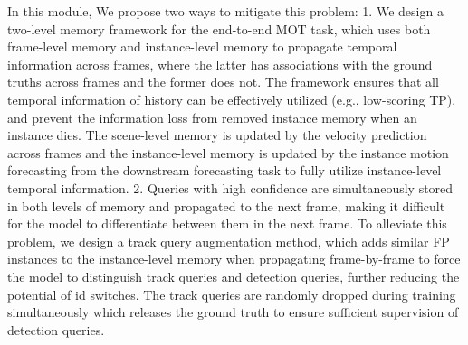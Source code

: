 

In this module, We propose two ways to mitigate this problem: 1. We design a two-level memory framework for the end-to-end MOT task, which uses both frame-level memory and instance-level memory to propagate temporal information across frames, where the latter has associations with the ground truths across frames and the former does not. The framework ensures that all temporal information of history can be effectively utilized (e.g., low-scoring TP), and prevent the information loss from removed instance memory when an instance dies. The scene-level memory is updated by the velocity prediction across frames and the instance-level memory is updated by the instance motion forecasting from the downstream forecasting task to fully utilize instance-level temporal information. 2. Queries with high confidence are simultaneously stored in both levels of memory and propagated to the next frame, making it difficult for the model to differentiate between them in the next frame. To alleviate this problem, we design a track query augmentation method, which adds similar FP instances to the instance-level memory when propagating frame-by-frame to force the model to distinguish track queries and detection queries, further reducing the potential of id switches. The track queries are randomly dropped during training simultaneously which releases the ground truth to ensure sufficient supervision of detection queries.



